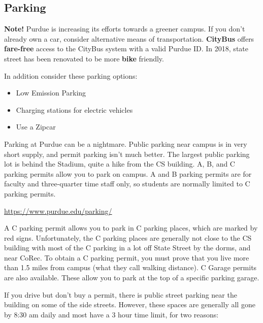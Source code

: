 \subsection{Parking}

\begin{tcolorbox}[colback=green!5!white,colframe=green!75!black]
	\textbf{Note!} Purdue is increasing its efforts towards a greener campus. If you don't already own a car, consider alternative means of transportation. \textbf{CityBus} offers \textbf{fare-free} access to the CityBus system with a valid Purdue ID. In 2018, state street has been renovated to be more \textbf{bike} friendly.

	\vspace{\baselineskip}
	In addition consider these parking options:
	\begin{itemize}
		\item Low Emission Parking
		\item Charging stations for electric vehicles
		\item Use a Zipcar
	\end{itemize}
\end{tcolorbox}

Parking at Purdue can be a nightmare. Public parking near campus is in very short supply, and permit parking isn't much better. The largest public parking lot is behind the Stadium, quite a hike from the CS building. A, B, and C parking permits allow you to park on campus. A and B parking permits are for faculty and three-quarter time staff only, so students are normally limited to C parking permits.

\centerline{\url{https://www.purdue.edu/parking/}}
\vspace{\baselineskip}

A C parking permit allows you to park in C parking places, which are marked by red signs. Unfortunately, the C parking places are generally not close to the CS building with most of the C parking in a lot off State Street by the dorms, and near CoRec. To obtain a C parking permit, you must prove that you live more than 1.5 miles from campus (what they call walking distance). C Garage permits are also available. These allow you to park at the top of a specific parking garage.

If you drive but don't buy a permit, there is public street parking near the building on some of the side streets. However, these spaces are generally all gone by 8:30 am daily and most have a 3 hour time limit, for two reasons:

